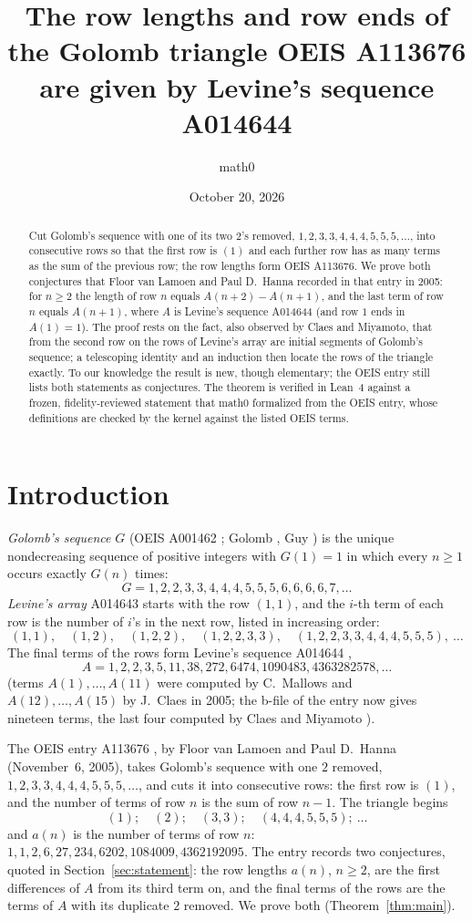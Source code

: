 \documentclass[11pt]{amsart}
\title[The Golomb triangle A113676 and Levine's sequence A014644]{The row lengths and row ends of the Golomb triangle OEIS A113676 are given by Levine's sequence A014644}
\author{math0}
\date{October 20, 2026}
\theoremstyle{plain}
\theoremstyle{definition}
\begin{document}
\begin{abstract}
Cut Golomb's sequence with one of its two $2$'s removed, $1,2,3,3,4,4,4,5,5,5,\dots$, into consecutive rows so that the first row is $(1)$ and each further row has as many terms as the sum of the previous row; the row lengths form OEIS A113676.
We prove both conjectures that Floor van Lamoen and Paul D.\ Hanna recorded in that entry in 2005: for $n\ge2$ the length of row $n$ equals $A(n+2)-A(n+1)$, and the last term of row $n$ equals $A(n+1)$, where $A$ is Levine's sequence A014644 (and row $1$ ends in $A(1)=1$).
The proof rests on the fact, also observed by Claes and Miyamoto, that from the second row on the rows of Levine's array are initial segments of Golomb's sequence; a telescoping identity and an induction then locate the rows of the triangle exactly.
To our knowledge the result is new, though elementary; the OEIS entry still lists both statements as conjectures.
The theorem is verified in Lean~4 against a frozen, fidelity-reviewed statement that math0 formalized from the OEIS entry, whose definitions are checked by the kernel against the listed OEIS terms.
\end{abstract}
\maketitle

\section{Introduction}

\emph{Golomb's sequence} $G$ (OEIS A001462 \cite{A001462}; Golomb \cite{Go}, Guy \cite[E25]{Guy}) is the unique nondecreasing sequence of positive integers with $G(1)=1$ in which every $n\ge1$ occurs exactly $G(n)$ times:
\[
  G = 1,2,2,3,3,4,4,4,5,5,5,6,6,6,6,7,\dots
\]
\emph{Levine's array} A014643 \cite{A014643} starts with the row $(1,1)$, and the $i$-th term of each row is the number of $i$'s in the next row, listed in increasing order:
\[
  (1,1),\quad (1,2),\quad (1,2,2),\quad (1,2,2,3,3),\quad (1,2,2,3,3,4,4,4,5,5,5),\ \dots
\]
The final terms of the rows form Levine's sequence A014644 \cite{A014644},
\[
  A = 1,2,2,3,5,11,38,272,6474,1090483,4363282578,\dots
\]
(terms $A(1),\dots,A(11)$ were computed by C.~Mallows and $A(12),\dots,A(15)$ by J.~Claes in 2005; the b-file of the entry now gives nineteen terms, the last four computed by Claes and Miyamoto \cite{A014644,CM}).

The OEIS entry A113676 \cite{A113676}, by Floor van Lamoen and Paul D.\ Hanna (November~6, 2005), takes Golomb's sequence with one $2$ removed, $1,2,3,3,4,4,4,5,5,5,\dots$, and cuts it into consecutive rows: the first row is $(1)$, and the number of terms of row $n$ is the sum of row $n-1$. The triangle begins
\[
  (1);\quad (2);\quad (3,3);\quad (4,4,4,5,5,5);\ \dots
\]
and $a(n)$ is the number of terms of row $n$: $1,1,2,6,27,234,6202,1084009,4362192095$.
The entry records two conjectures, quoted in Section~\ref{sec:statement}: the row lengths $a(n)$, $n\ge2$, are the first differences of $A$ from its third term on, and the final terms of the rows are the terms of $A$ with its duplicate $2$ removed. We prove both (Theorem~\ref{thm:main}).
\end{document}

